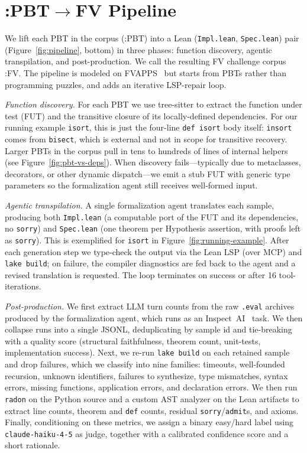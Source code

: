 \section{\FVSpec:PBT$\to$FV Pipeline}

We lift each PBT in the  corpus (\FVSpec:PBT) into a Lean
(\texttt{Impl.lean}, \texttt{Spec.lean}) pair (Figure~\ref{fig:pipeline},
bottom) in three phases: function discovery, agentic transpilation, and
post-production.
We call the resulting FV challenge corpus \FVSpec:FV.
 The pipeline is modeled on
FVAPPS~\cite{dougherty2025proving} but starts from PBTs rather
than programming puzzles, and adds an iterative LSP-repair loop.

\emph{Function discovery.}\label{sec:pipeline-discovery}
For each PBT we use tree-sitter to extract the function under test
(FUT) and the transitive closure of its locally-defined dependencies. For
our running example \texttt{isort}, this is just the four-line \texttt{def
isort} body itself: \texttt{insort} comes from \texttt{bisect}, which is
external and not in scope for transitive recovery. Larger PBTs in the
corpus pull in tens to hundreds of lines of internal helpers
(see Figure~\ref{fig:pbt-vs-deps}). When discovery fails---typically due
to metaclasses, decorators, or other dynamic dispatch---we emit a stub
FUT with generic type parameters so the formalization agent still
receives well-formed input.

\emph{Agentic transpilation.} A single formalization agent translates each sample, producing both
\texttt{Impl.lean} (a computable port of the FUT and its dependencies, no
\texttt{sorry}) and \texttt{Spec.lean} (one theorem per Hypothesis
assertion, with proofs left as \texttt{sorry}). This is exemplified for \texttt{isort} in 
Figure~\ref{fig:running-example}.
After each generation step we type-check the output via the Lean LSP
(over MCP) and \texttt{lake build}; on failure, the compiler diagnostics
are fed back to the agent and a revised translation is requested. The
loop terminates on success or after 16 tool-iterations.

\emph{Post-production.} We first extract LLM turn counts from the raw
\texttt{.eval} archives produced by the formalization agent, which runs
as an Inspect~AI~\cite{UKAISI_inspect_2024} task. We then
collapse runs into a single JSONL, deduplicating by sample id and
tie-breaking with a quality score (structural faithfulness, theorem
count, unit-tests, implementation success). Next, we re-run
\texttt{lake build} on each retained sample and drop failures, which we
classify into nine families: timeouts, well-founded recursion,
unknown identifiers, failures to synthesize, type mismatches, syntax
errors, missing functions, application errors, and declaration errors.
We then run \texttt{radon} on the Python source and a custom AST
analyzer on the Lean artifacts to extract line counts, theorem and
\texttt{def} counts, residual \texttt{sorry}/\texttt{admit}s, and
axioms. Finally, conditioning on these metrics, we assign a binary
easy/hard label using \texttt{claude-haiku-4-5} as judge, together with
a calibrated confidence score and a short rationale.

